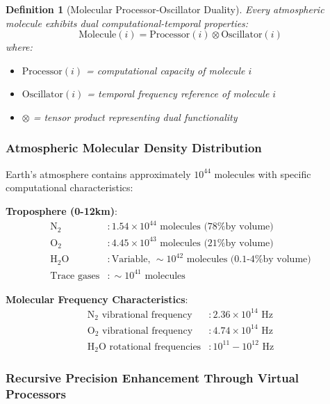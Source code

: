 \documentclass[12pt,a4paper]{article}
\newtheorem{definition}{Definition}
\begin{document}
\begin{definition}[Molecular Processor-Oscillator Duality]
Every atmospheric molecule exhibits dual computational-temporal properties:
\begin{equation}
\text{Molecule}(i) = \text{Processor}(i) \otimes \text{Oscillator}(i)
\end{equation}
where:
\begin{itemize}
\item $\text{Processor}(i)$ = computational capacity of molecule $i$
\item $\text{Oscillator}(i)$ = temporal frequency reference of molecule $i$
\item $\otimes$ = tensor product representing dual functionality
\end{itemize}
\end{definition}

\subsubsection{Atmospheric Molecular Density Distribution}

Earth's atmosphere contains approximately $10^{44}$ molecules with specific computational characteristics:

\textbf{Troposphere (0-12km)}:
\begin{align}
\text{N}_2 &: 1.54 \times 10^{44} \text{ molecules (78\% by volume)} \\
\text{O}_2 &: 4.45 \times 10^{43} \text{ molecules (21\% by volume)} \\
\text{H}_2\text{O} &: \text{Variable, } \sim 10^{42} \text{ molecules (0.1-4\% by volume)} \\
\text{Trace gases} &: \sim 10^{41} \text{ molecules}
\end{align}

\textbf{Molecular Frequency Characteristics}:
\begin{align}
\text{N}_2 \text{ vibrational frequency} &: 2.36 \times 10^{14} \text{ Hz} \\
\text{O}_2 \text{ vibrational frequency} &: 4.74 \times 10^{14} \text{ Hz} \\
\text{H}_2\text{O} \text{ rotational frequencies} &: 10^{11} - 10^{12} \text{ Hz}
\end{align}

\subsubsection{Recursive Precision Enhancement Through Virtual Processors}
\end{document}
